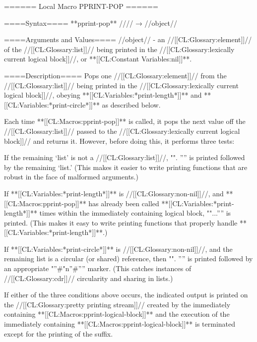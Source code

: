 ====== Local Macro PPRINT-POP ======

====Syntax====
**pprint-pop** //\noargs// → //object//

====Arguments and Values====
//object// - an //[[CL:Glossary:element]]// of the //[[CL:Glossary:list]]// being printed in the //[[CL:Glossary:lexically current logical block]]//, or **[[CL:Constant Variables:nil]]**.

====Description====
Pops one //[[CL:Glossary:element]]// from the //[[CL:Glossary:list]]// being printed in the //[[CL:Glossary:lexically current logical block]]//, obeying **[[CL:Variables:*print-length*]]** and **[[CL:Variables:*print-circle*]]** as described below.

Each time **[[CL:Macros:pprint-pop]]** is called, it pops the next value off the //[[CL:Glossary:list]]// passed to the //[[CL:Glossary:lexically current logical block]]// and returns it. However, before doing this, it performs three tests:

\beginlist \item{\bull} If the remaining `list' is not a //[[CL:Glossary:list]]//, "". '''' is printed followed by the remaining `list.' (This makes it easier to write printing functions that are robust in the face of malformed arguments.)

\item{\bull} If **[[CL:Variables:*print-length*]]** is //[[CL:Glossary:non-nil]]//, and **[[CL:Macros:pprint-pop]]** has already been called **[[CL:Variables:*print-length*]]** times within the immediately containing logical block, ""...'''' is printed. (This makes it easy to write printing functions that properly handle **[[CL:Variables:*print-length*]]**.)

\item{\bull} If **[[CL:Variables:*print-circle*]]** is //[[CL:Glossary:non-nil]]//, and the remaining list is a circular (or shared) reference, then "". '''' is printed followed by an appropriate "''#"n''#'''' marker. (This catches instances of //[[CL:Glossary:cdr]]// circularity and sharing in lists.) \endlist

If either of the three conditions above occurs, the indicated output is printed on the //[[CL:Glossary:pretty printing stream]]// created by the immediately containing **[[CL:Macros:pprint-logical-block]]** and the execution of the immediately containing **[[CL:Macros:pprint-logical-block]]** is terminated except for the printing of the suffix.

